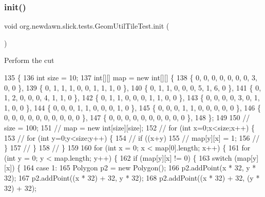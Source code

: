 \subsubsection{\texorpdfstring{init()}{init()}\hspace{0.1cm}{\footnotesize\ttfamily [1/2]}}
{\footnotesize\ttfamily void org.\+newdawn.\+slick.\+tests.\+Geom\+Util\+Tile\+Test.\+init (\begin{DoxyParamCaption}{ }\end{DoxyParamCaption})\hspace{0.3cm}{\ttfamily [inline]}}

Perform the cut 
\begin{DoxyCode}
135                        \{
136         \textcolor{keywordtype}{int} size = 10;
137         \textcolor{keywordtype}{int}[][] map = \textcolor{keyword}{new} \textcolor{keywordtype}{int}[][] \{ 
138                 \{ 0, 0, 0, 0, 0, 0, 0, 3, 0, 0 \},
139                 \{ 0, 1, 1, 1, 0, 0, 1, 1, 1, 0 \},
140                 \{ 0, 1, 1, 0, 0, 0, 5, 1, 6, 0 \},
141                 \{ 0, 1, 2, 0, 0, 0, 4, 1, 1, 0 \},
142                 \{ 0, 1, 1, 0, 0, 0, 1, 1, 0, 0 \},
143                 \{ 0, 0, 0, 0, 3, 0, 1, 1, 0, 0 \},
144                 \{ 0, 0, 0, 1, 1, 0, 0, 0, 1, 0 \},
145                 \{ 0, 0, 0, 1, 1, 0, 0, 0, 0, 0 \},
146                 \{ 0, 0, 0, 0, 0, 0, 0, 0, 0, 0 \},
147                 \{ 0, 0, 0, 0, 0, 0, 0, 0, 0, 0 \}, 
148                 \};
149         
150 \textcolor{comment}{//      size = 100;}
151 \textcolor{comment}{//      map = new int[size][size];}
152 \textcolor{comment}{//      for (int x=0;x<size;x++) \{}
153 \textcolor{comment}{//          for (int y=0;y<size;y++) \{}
154 \textcolor{comment}{//              if ((x+y) %
155 \textcolor{comment}{//                  map[y][x] = 1;}
156 \textcolor{comment}{//              \}}
157 \textcolor{comment}{//          \}}
158 \textcolor{comment}{//      \}}
159         
160         \textcolor{keywordflow}{for} (\textcolor{keywordtype}{int} x = 0; x < map[0].length; x++) \{
161             \textcolor{keywordflow}{for} (\textcolor{keywordtype}{int} y = 0; y < map.length; y++) \{
162                 \textcolor{keywordflow}{if} (map[y][x] != 0) \{
163                     \textcolor{keywordflow}{switch} (map[y][x]) \{
164                     \textcolor{keywordflow}{case} 1:
165                         Polygon p2 = \textcolor{keyword}{new} Polygon();
166                         p2.addPoint(x * 32, y * 32);
167                         p2.addPoint((x * 32) + 32, y * 32);
168                         p2.addPoint((x * 32) + 32, (y * 32) + 32);
}
\end{DoxyCode}
